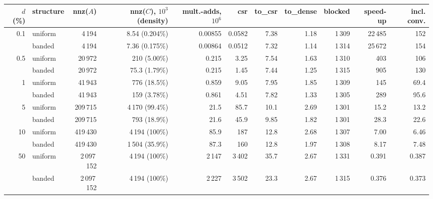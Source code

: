 \begin{tabular}{rlrrrrrrrrr}
\toprule
$d$ (\%) & structure & nnz($A$) & nnz($C$), $10^3$ (density) & mult.-adds, $10^6$ & csr & to\_csr & to\_dense & blocked & speed-up & incl. conv. \\
\midrule
0.1 & uniform & 4\,194 & 8.54 (0.204\%) & 0.00855 & 0.0582 & 7.38 & 1.18 & 1\,309 & 22\,485 & 152 \\
 & banded & 4\,194 & 7.36 (0.175\%) & 0.00864 & 0.0512 & 7.32 & 1.14 & 1\,314 & 25\,672 & 154 \\
0.5 & uniform & 20\,972 & 210 (5.00\%) & 0.215 & 3.25 & 7.54 & 1.63 & 1\,310 & 403 & 106 \\
 & banded & 20\,972 & 75.3 (1.79\%) & 0.215 & 1.45 & 7.44 & 1.25 & 1\,315 & 905 & 130 \\
1 & uniform & 41\,943 & 776 (18.5\%) & 0.859 & 9.05 & 7.95 & 1.85 & 1\,309 & 145 & 69.4 \\
 & banded & 41\,943 & 159 (3.78\%) & 0.861 & 4.51 & 7.82 & 1.33 & 1\,305 & 289 & 95.6 \\
5 & uniform & 209\,715 & 4\,170 (99.4\%) & 21.5 & 85.7 & 10.1 & 2.69 & 1\,301 & 15.2 & 13.2 \\
 & banded & 209\,715 & 793 (18.9\%) & 21.6 & 45.9 & 9.85 & 1.82 & 1\,301 & 28.3 & 22.6 \\
10 & uniform & 419\,430 & 4\,194 (100\%) & 85.9 & 187 & 12.8 & 2.68 & 1\,307 & 7.00 & 6.46 \\
 & banded & 419\,430 & 1\,504 (35.9\%) & 87.3 & 160 & 12.8 & 1.97 & 1\,308 & 8.17 & 7.48 \\
50 & uniform & 2\,097\,152 & 4\,194 (100\%) & 2\,147 & 3\,402 & 35.7 & 2.67 & 1\,331 & 0.391 & 0.387 \\
 & banded & 2\,097\,152 & 4\,194 (100\%) & 2\,227 & 3\,502 & 23.3 & 2.67 & 1\,315 & 0.376 & 0.373 \\
\bottomrule
\end{tabular}
